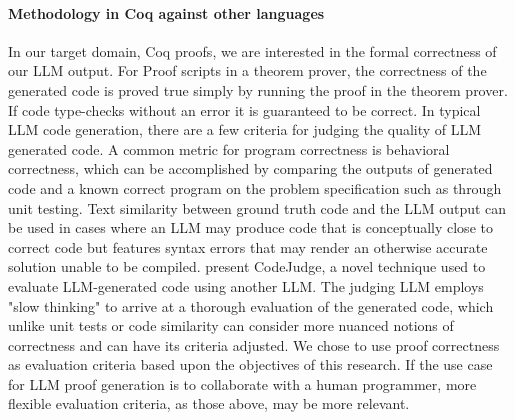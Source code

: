 \paragraph
{Methodology in Coq against other languages}
In our target domain, Coq proofs, 
we are interested in the formal correctness of our LLM output.
For Proof scripts in a theorem prover,
the correctness of the generated code is proved true
simply by running the proof in the theorem prover.
If code type-checks without an error it is guaranteed to be correct.
In typical LLM code generation,
there are a few criteria for judging the quality of LLM generated code.  
A common metric for program correctness is behavioral correctness,
which can be accomplished by comparing the outputs of generated code
and a known correct program on the problem specification such as through unit testing.
Text similarity between ground truth code and the LLM output can be used
in cases where an LLM may produce code that is conceptually close
to correct code but features syntax errors that may render an
otherwise accurate solution unable to be compiled.
\citet{CodeJudge} present CodeJudge, a novel technique
used to evaluate LLM-generated code using another LLM.
The judging LLM employs "slow thinking" to arrive at a
thorough evaluation of the generated code,
which unlike unit tests or code similarity can consider
more nuanced notions of correctness and can have its
criteria adjusted.
We chose to use proof correctness as evaluation criteria
based upon the objectives of this research.
If the use case for LLM proof generation is to
collaborate with a human programmer,
more flexible evaluation criteria, as those above, may be more relevant. 

